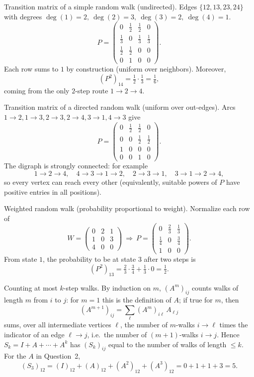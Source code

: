 \documentclass[11pt]{article}
\def\textbf#1{#1}%
\begin{document}
\begin{solution}
\textbf{Transition matrix of a simple random walk (undirected).}
Edges $\{12,13,23,24\}$ with degrees $\deg(1)=2,\ \deg(2)=3,\ \deg(3)=2,\ \deg(4)=1$.
\[
P=\begin{pmatrix}
0&\tfrac12&\tfrac12&0\\[2pt]
\tfrac13&0&\tfrac13&\tfrac13\\[2pt]
\tfrac12&\tfrac12&0&0\\[2pt]
0&1&0&0
\end{pmatrix}.
\]
Each row sums to $1$ by construction (uniform over neighbors).
Moreover,
\[
(P^2)_{14}=\tfrac12\cdot\tfrac13=\tfrac16,
\]
coming from the only $2$-step route $1\!\to\!2\!\to\!4$.
\end{solution}

\begin{solution}
\textbf{Transition matrix of a directed random walk (uniform over out-edges).}
Arcs $1\to2,1\to3,2\to3,2\to4,3\to1,4\to3$ give
\[
P=\begin{pmatrix}
0&\tfrac12&\tfrac12&0\\
0&0&\tfrac12&\tfrac12\\
1&0&0&0\\
0&0&1&0
\end{pmatrix}.
\]
The digraph is strongly connected: for example
\[
1\to2\to4,\quad 4\to3\to1\to2,\quad 2\to3\to1,\quad 3\to1\to2\to4,
\]
so every vertex can reach every other (equivalently, suitable powers of $P$ have positive entries in all positions).
\end{solution}

\begin{solution}
\textbf{Weighted random walk (probability proportional to weight).}
Normalize each row of
\[
W=\begin{pmatrix}
0&2&1\\
1&0&3\\
4&0&0
\end{pmatrix}
\ \Rightarrow\
P=\begin{pmatrix}
0&\tfrac{2}{3}&\tfrac{1}{3}\\[2pt]
\tfrac{1}{4}&0&\tfrac{3}{4}\\[2pt]
1&0&0
\end{pmatrix}.
\]
From state $1$, the probability to be at state $3$ after two steps is
\[
(P^2)_{13}=\tfrac{2}{3}\cdot\tfrac{3}{4}+\tfrac{1}{3}\cdot 0=\tfrac12.
\]
\end{solution}

\begin{solution}
\textbf{Counting at most \(k\)-step walks.}
By induction on $m$, $(A^m)_{ij}$ counts walks of length $m$ from $i$ to $j$:
for $m=1$ this is the definition of $A$; if true for $m$, then
\[
(A^{m+1})_{ij}=\sum_{\ell} (A^m)_{i\ell}\,A_{\ell j}
\]
sums, over all intermediate vertices $\ell$, the number of $m$-walks $i\to \ell$ times the indicator of an edge $\ell\to j$, i.e.\ the number of $(m{+}1)$-walks $i\to j$.
Hence $S_k=I+A+\cdots+A^k$ has $(S_k)_{ij}$ equal to the number of walks of length $\le k$.
For the $A$ in Question~2,
\[
(S_3)_{12}= (I)_{12}+(A)_{12}+(A^2)_{12}+(A^3)_{12}=0+1+1+3=5.
\]
\end{solution}
\end{document}
